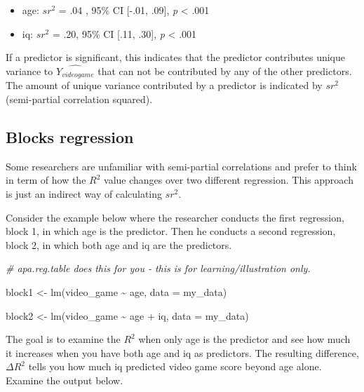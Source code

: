 \documentclass[
]{krantz}
\makeatletter
\newenvironment{Shaded}{\begin{snugshade}}{\end{snugshade}}
\newcommand{\AttributeTok}[1]{\textcolor[rgb]{0.61,0.61,0.61}{#1}}
\newcommand{\CommentTok}[1]{\textcolor[rgb]{0.37,0.37,0.37}{\textit{#1}}}
\newcommand{\FunctionTok}[1]{\textcolor[rgb]{0,0,0}{#1}}
\newcommand{\NormalTok}[1]{#1}
\newcommand{\OtherTok}[1]{\textcolor[rgb]{0.37,0.37,0.37}{#1}}
\newcommand{\SpecialCharTok}[1]{\textcolor[rgb]{0,0,0}{#1}}
\newenvironment{kframe}{%
\medskip{}
\setlength{\fboxsep}{.8em}
 \def\at@end@of@kframe{}%
 \ifinner\ifhmode%
  \def\at@end@of@kframe{\end{minipage}}%
  \begin{minipage}{\columnwidth}%
 \fi\fi%
 \def\FrameCommand##1{\hskip\@totalleftmargin \hskip-\fboxsep
 \colorbox{shadecolor}{##1}\hskip-\fboxsep
     \hskip-\linewidth \hskip-\@totalleftmargin \hskip\columnwidth}%
 \MakeFramed {\advance\hsize-\width
   \@totalleftmargin\z@ \linewidth\hsize
   \@setminipage}}%
 {\par\unskip\endMakeFramed%
 \at@end@of@kframe}
\renewenvironment{Shaded}{\begin{kframe}}{\end{kframe}}
\makeatother
\begin{document}
\begin{itemize}
\item
  age: \(sr^2\) = .04 , 95\% CI {[}-.01, .09{]}, \emph{p} \textless{} .001
\item
  iq: \(sr^2\) = .20, 95\% CI {[}.11, .30{]}, \emph{p} \textless{} .001
\end{itemize}

If a predictor is significant, this indicates that the predictor contributes unique variance to \(\widehat{Y_{video game}}\) that can not be contributed by any of the other predictors. The amount of unique variance contributed by a predictor is indicated by \(sr^2\) (semi-partial correlation squared).

\hypertarget{blocks-regression}{%
\subsection{Blocks regression}\label{blocks-regression}}

Some researchers are unfamiliar with semi-partial correlations and prefer to think in term of how the \(R^2\) value changes over two different regression. This approach is just an indirect way of calculating \(sr^2\).

Consider the example below where the researcher conducts the first regression, block 1, in which age is the predictor. Then he conducts a second regression, block 2, in which both age and iq are the predictors.

\begin{Shaded}
\begin{Highlighting}[]
\CommentTok{\# apa.reg.table does this for you {-} this is for learning/illustration only.}

\NormalTok{block1 }\OtherTok{\textless{}{-}} \FunctionTok{lm}\NormalTok{(video\_game }\SpecialCharTok{\textasciitilde{}}\NormalTok{ age,}
             \AttributeTok{data =}\NormalTok{ my\_data)}

\NormalTok{block2 }\OtherTok{\textless{}{-}} \FunctionTok{lm}\NormalTok{(video\_game }\SpecialCharTok{\textasciitilde{}}\NormalTok{ age }\SpecialCharTok{+}\NormalTok{ iq,}
             \AttributeTok{data =}\NormalTok{ my\_data)}
\end{Highlighting}
\end{Shaded}

The goal is to examine the \(R^2\) when only age is the predictor and see how much it increases when you have both age and iq as predictors. The resulting difference, \(\Delta R^2\) tells you how much iq predicted video game score beyond age alone. Examine the output below.
\end{document}
